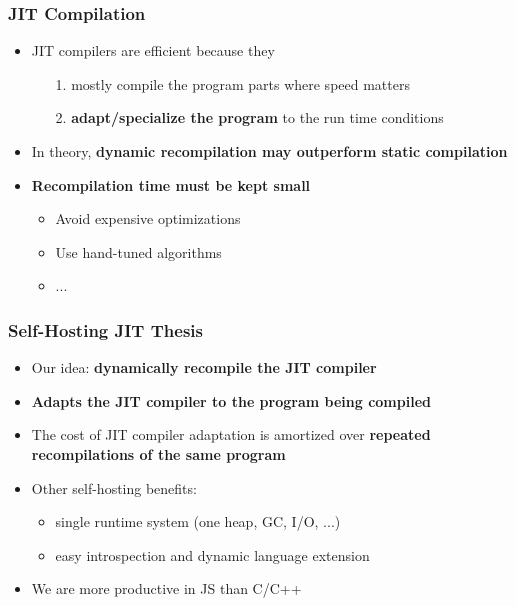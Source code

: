 \begin{frame}
\frametitle{\bf JIT Compilation}

  \begin{itemize}

  \item JIT compilers are efficient because they
    \begin{itemize}
      \item[1.] mostly compile the program parts where speed matters
      \item[2.] {\bf adapt/specialize the program} to the run time conditions
    \end{itemize}
    \smallskip

  \item In theory, {\bf dynamic recompilation may outperform static compilation}
    \smallskip

  \item {\bf Recompilation time must be kept small}
    \begin{itemize}
    \item Avoid expensive optimizations
    \item Use hand-tuned algorithms
    \item ...
    \end{itemize}
    \smallskip

  \end{itemize}
\end{frame}

\begin{frame}
\frametitle{\bf Self-Hosting JIT Thesis}

  \begin{itemize}

  \item Our idea: {\bf dynamically recompile the JIT compiler}
    \bigskip
    \bigskip

  \item {\bf Adapts the JIT compiler to the program being compiled}
    \smallskip

  \item The cost of JIT compiler adaptation is amortized over
    {\bf repeated recompilations of the same program}
    \bigskip
    \bigskip

  \item Other self-hosting benefits:
    \begin{itemize}
      \item single runtime system (one heap, GC, I/O, ...)
      \item easy introspection and dynamic language extension
    \end{itemize}
    \smallskip

  \item We are more productive in JS than C/C++

  \end{itemize}
\end{frame}

